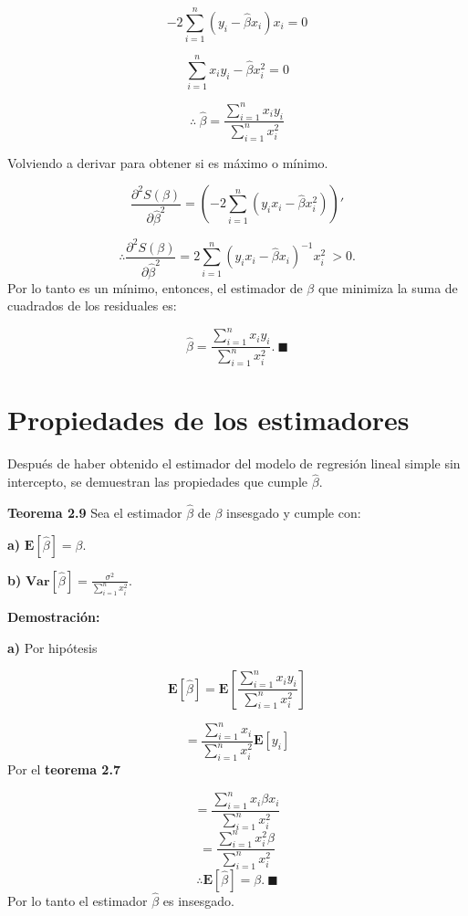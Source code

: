 \documentclass[
  a4paper,
  oneside,
  openany]{book}
\begin{document}
\[-2\sum_{i=1}^{n}\left(y_{i}-\hat{\beta}x_{i}\right)x_{i}=0\]

\[\sum_{i=1}^{n}x_{i}y_{i}-\hat{\beta}x_{i}^2=0\]

\[\therefore \ \hat{\beta}=\frac{\sum_{i=1}^{n}x_{i}y_{i}}{\sum_{i=1}^{n}x_{i}^2}\]

Volviendo a derivar para obtener si es máximo o mínimo.

\[\frac{\partial^2 S(\beta)}{\partial \hat{\beta}^2}=\left(-2\sum_{i=1}^{n}\left(y_{i}x_{i}-\hat{\beta}x_{i}^2\right)\right)'\]

\[\therefore \frac{\partial^2 S(\beta)}{\partial \hat{\beta}^2}=2\sum_{i=1}^{n}\left(y_{i}x_{i}-\hat{\beta}x_{i}\right)^{-1}x_{i}^2 \ > 0.\]
Por lo tanto es un mínimo, entonces, el estimador de \(\beta\) que minimiza la suma de cuadrados de los residuales es:

\[\hat{\beta}=\frac{\sum_{i=1}^{n}x_{i}y_{i}}{\sum_{i=1}^{n}x_{i}^2}. \ \blacksquare\]

\hypertarget{propiedades-de-los-estimadores-1}{%
\section{Propiedades de los estimadores}\label{propiedades-de-los-estimadores-1}}

Después de haber obtenido el estimador del modelo de regresión lineal simple sin intercepto, se demuestran las propiedades que cumple \(\hat{\beta}.\)

\textbf{Teorema 2.9} Sea el estimador \(\hat{\beta}\) de \(\beta\) insesgado y cumple con:

\textbf{a)} \(\mathbf{E}\left[\hat{\beta}\right]=\beta.\)

\textbf{b)} \(\textbf{Var}\left[ \hat{\beta}\right]=\frac{\sigma^2}{\sum_{i=1}^{n}x_{i}^2}.\)

\textbf{Demostración:}

\textbf{a)} Por hipótesis

\[\mathbf{E}\left[\hat{\beta}\right]=\mathbf{E}\left[\frac{\sum_{i=1}^{n}x_{i}y_{i}}{\sum_{i=1}^{n}x_{i}^2}\right]\]

\[=\frac{\sum_{i=1}^{n}x_{i}}{{\sum_{i=1}^{n}x_{i}^2}}\mathbf{E}[y_{i}]\]
Por el \textbf{teorema 2.7}

\[=\frac{\sum_{i=1}^{n}x_{i}\beta x_{i}}{{\sum_{i=1}^{n}x_{i}^2}}\]
\[=\frac{\sum_{i=1}^{n}x_{i}^2\beta}{{\sum_{i=1}^{n}x_{i}^2}}\]
\[\therefore \mathbf{E}\left[\hat{\beta}\right]=\beta. \ \blacksquare\]
Por lo tanto el estimador \(\hat{\beta}\) es insesgado.
\end{document}
